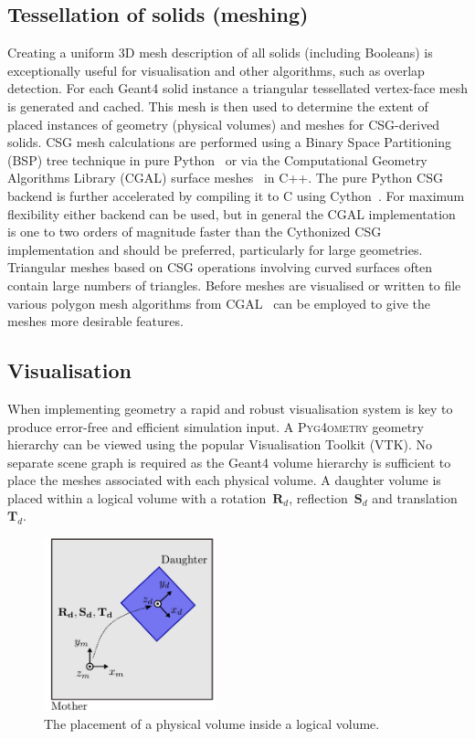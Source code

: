 \documentclass[preprint,12pt]{elsarticle}
\newcommand{\PYGEOMETRY}{\textsc{Pyg4ometry}}
\begin{document}
\subsection{Tessellation of solids (meshing)}
Creating a uniform 3D mesh description of all solids (including Booleans) is exceptionally useful for visualisation and other algorithms, such as overlap
detection. For each Geant4 solid instance a triangular tessellated vertex-face mesh is generated and cached. This mesh is then used to determine the extent
of placed instances of geometry (physical volumes) and meshes for CSG-derived solids. CSG mesh calculations are performed using a Binary Space Partitioning
(BSP) tree technique in pure Python~\cite{pycsg} or via the Computational
Geometry Algorithms Library (CGAL) surface meshes~\cite{cgal:bsmf-sm-20b}
in C++. The pure Python CSG backend is further accelerated by compiling it
to C using Cython~\cite{cython}.
For maximum flexibility either backend can be used, but in general the
CGAL implementation is one to two orders of magnitude faster than the
Cythonized CSG implementation and should be preferred, particularly for large geometries.
Triangular meshes based on CSG operations involving curved surfaces often contain large numbers of triangles. Before meshes are visualised or written to file
various polygon mesh algorithms  from CGAL~\cite{cgal:lty-pmp-20b} can be employed to give the meshes more desirable features.


\subsection{Visualisation} \label{sec:visualisation}
When implementing geometry a rapid and robust visualisation system is key to produce error-free and efficient simulation input.
A  \PYGEOMETRY{} geometry hierarchy can be viewed using the popular Visualisation Toolkit (VTK). No separate scene graph is required as the Geant4
volume hierarchy is sufficient to place the meshes associated with each physical volume. A daughter volume is placed within a logical volume with a
rotation~$\mathbf{R}_d$, reflection~$\mathbf{S}_d$ and translation~$\mathbf{T}_d$.

\begin{figure}[htb!]
\begin{center}
\includegraphics[width=5cm]{lvToPv.pdf}
\caption{The placement of a physical volume inside a logical volume.}
\label{fig:lvToPv}
\end{center}
\end{figure}
\end{document}
